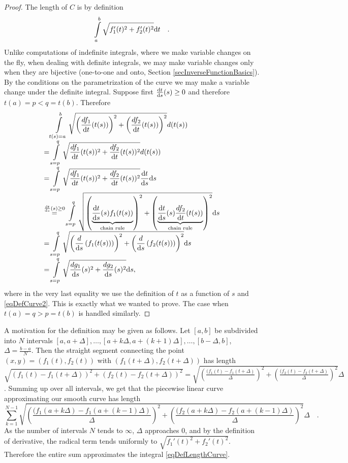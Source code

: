 \documentclass[12pt]{book}
\begin{document}
\begin{proof}
The length of $C$ is by definition
\[
\int\limits_{a}^b \sqrt{f_1'(t)^2+f_2'(t)^2}{\normalfont \text{d}} t \quad .
\]
Unlike computations of indefinite integrals, where we make variable changes on the fly, when dealing with definite integrals, we may make variable changes only when they are bijective (one-to-one and onto, Section \ref{secInverseFunctionBasics}). By the conditions on the parametrization of the curve we may make a variable change under the definite integral. Suppose first $\frac{{\normalfont \text{d}} t}{{\normalfont \text{d}} s}(s)\geq 0$ and therefore $t(a)=p<q=t(b)$. Therefore
\[
\begin{array}{l}
\phantom{=}\displaystyle \int\limits_{t(s)=a}^b \sqrt{\left(\frac{df_1}{{\normalfont \text{d}} t}(t(s))\right)^2+\left(\frac{df_2}{{\normalfont \text{d}} t}(t(s))\right)^2}d(t(s)) \\
\displaystyle =  \int \limits_{s=p}^q \sqrt{\frac{df_1}{{\normalfont \text{d}} t}( t(s))^2+ \frac{df_2}{{\normalfont \text{d}} t}(t(s))^2}d(t(s))\\
= \displaystyle \int\limits_{s=p}^q \sqrt{\frac{df_1}{{\normalfont \text{d}} t}( t(s))^2 + \frac{df_2 }{{\normalfont \text{d}} t}(t(s))^2} \frac{{\normalfont \text{d}} t}{{\normalfont \text{d}} s}{\normalfont \text{d}} s \\
\displaystyle
\stackrel{\frac{{\normalfont \text{d}} t}{{\normalfont \text{d}} s}(s)\geq 0}{=}  \int\limits_{s=p}^q \sqrt{ \left( \underbrace{ \frac{{\normalfont \text{d}} t}{{\normalfont \text{d}} s}(s) f_1( t(s)) }_{ \text{chain rule} } \right)^2+ \left( \underbrace{ \frac{ {\normalfont \text{d}} t}{{\normalfont \text{d}} s}(s) \frac{df_2}{{\normalfont \text{d}} t} (t(s))}_{ \text{chain rule}} \right)^2}{\normalfont \text{d}} s \\
=\displaystyle \int\limits_{s=p}^q \sqrt{ \left(\frac{d}{{\normalfont \text{d}} s}\left(f_1(t(s))\right)\right)^2+ \left(\frac{d}{{\normalfont \text{d}} s}\left(f_2(t(s))\right)\right)^2}{\normalfont \text{d}} s \\
=\displaystyle \int\limits_{s=p}^q \sqrt{ \frac{ dg_1}{ {\normalfont \text{d}} s}( s)^2 + \frac{dg_2}{{\normalfont \text{d}} s}(s)^2}{\normalfont \text{d}} s,
\quad
\end{array}
\]
where in the very last equality we use the definition of $t$ as a function of $s$ and \eqref{eqDefCurve2}. This is exactly what we wanted to prove. The case when $t(a)=q>p=t(b)$ is handled similarly.
\end{proof}

A motivation for the definition may be given as follows. Let $[a,b]$ be subdivided into $N$ intervals $[a,a+\Delta ], \dots, [a+k\Delta, a+(k+1)\Delta],\dots, [b-\Delta, b]$, $\Delta=\frac{b-a}{N}$. Then the straight segment connecting the point $(x,y)=(f_1(t), f_2(t))$ with $(f_1(t+\Delta), f_2(t+\Delta))$ has length $\sqrt{(f_1(t)-f_1(t+\Delta))^2 + (f_2(t)-f_2(t+\Delta))^2}= \sqrt{\left(\frac{(f_1(t)-f_1(t+\Delta)}{\Delta}\right)^2 + \left(\frac{(f_2(t)- f_2(t+\Delta)}{\Delta} \right)^2}\Delta$. Summing up over all intervals, we get that the piecewise linear curve approximating our smooth curve has length
\[
\sum_{k=1}^{N-1} \sqrt{\left(\frac{(f_1(a+k\Delta)-f_1(a+(k-1)\Delta)}{\Delta}\right)^2 + \left(\frac{(f_2(a+k\Delta)- f_2(a+(k-1)\Delta)}{\Delta} \right)^2}\Delta\quad .
\]
As the number of intervals $N$ tends to $\infty$, $\Delta$ approaches 0, and by the definition of derivative, the radical term tends uniformly to $\sqrt{f_1'(t)^2+f_2'(t)^2}$. Therefore the entire sum approximates the integral \eqref{eqDefLengthCurve}.
\end{document}
